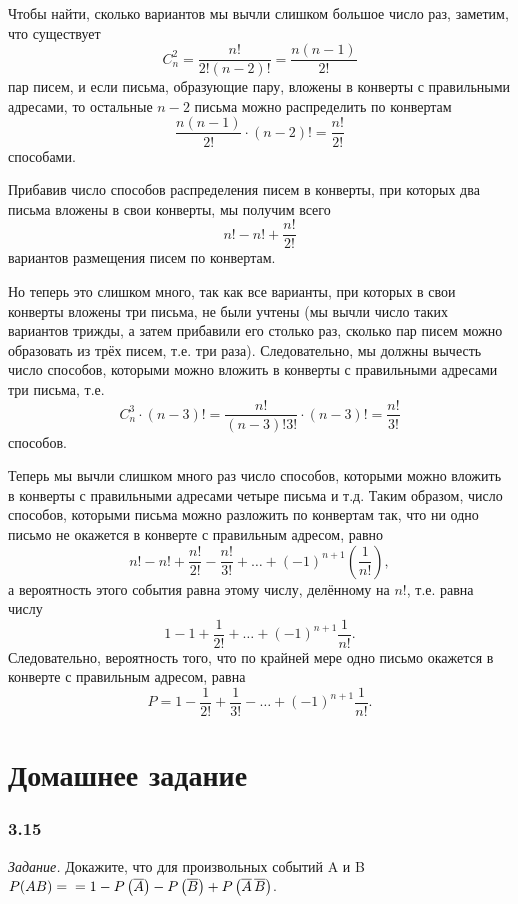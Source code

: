 \documentclass{book}
\begin{document}
Чтобы найти, сколько вариантов мы вычли слишком большое число раз, заметим, что существует 
$$C_n^2 =
\frac{n!}{2! \left( n-2 \right)!} =
\frac{n \left( n-1 \right) }{2!}$$
пар писем, и если письма, образующие пару, вложены в конверты с правильными адресами, то остальные $n - 2$ письма можно распределить по конвертам
$$\frac{n \left( n-1 \right)}{2!} \cdot \left( n-2 \right)! =
\frac{n!}{2!}$$
способами.

Прибавив число способов распределения писем в конверты, при которых два письма вложены в свои конверты, мы получим всего
$$n! - n! + \frac{n!}{2!}$$
вариантов размещения писем по конвертам.

Но теперь это слишком много,
так как все варианты, при которых в свои конверты вложены три письма, не были учтены
(мы вычли число таких вариантов трижды, а затем прибавили его столько раз,
сколько пар писем можно образовать из трёх писем, т.е. три раза).
Следовательно, мы должны вычесть число способов, которыми можно вложить в конверты с правильными адресами три письма, т.е.
$$C_n^3 \cdot \left( n-3 \right)! =
\frac{n!}{\left( n-3 \right)! 3!}\cdot \left( n-3 \right)! =
\frac{n!}{3!}$$
способов.

Теперь мы вычли слишком много раз число способов,
которыми можно вложить в конверты с правильными адресами четыре письма и т.д.
Таким образом, число способов, которыми письма можно разложить по конвертам так, что ни одно письмо не окажется в конверте с правильным адресом, равно
$$n! - n! + \frac{n!}{2!} - \frac{n!}{3!} + \dotsc + \left( -1 \right)^{n+1} \left( \frac{1}{n!} \right),$$
а вероятность этого события равна этому числу, делённому на $n!$, т.е. равна числу
$$1 - 1 + \frac{1}{2!} + \dotsc + \left( -1 \right)^{n+1} \frac{1}{n!}.$$
Следовательно, вероятность того, что по крайней мере одно письмо окажется в конверте с правильным адресом, равна
$$P =
1 - \frac{1}{2!} + \frac{1}{3!} - \dotsc + \left( -1 \right)^{n+1} \frac{1}{n!}.$$

\section*{Домашнее задание}

\subsubsection*{3.15}

\textit{Задание.} Докажите, что для произвольных событий A и B
$ P( AB ) = \\
= 1 - P\left( \overline{ A } \right) - P \left( \overline{ B } \right) + P \left( \overline{ A } \, \overline{ B } \right) $.
\end{document}
